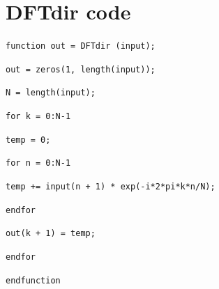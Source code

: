 \documentclass[a4paper, 12pt]{report}
\begin{document}
	\appendix
	\chapter{DFTdir code} %
	\label{sec:dftdir_code}
		\texttt{function out = DFTdir (input);}\par
		\texttt{out = zeros(1, length(input));}\par
		\indent\texttt{N = length(input);}\par
		\texttt{for k = 0:N-1}\par
		\hspace*{2em}\texttt{temp = 0;}\par
		\hspace*{2em}\texttt{for n = 0:N-1}\par
		\hspace*{4em}\texttt{temp += input(n + 1) * exp(-i*2*pi*k*n/N);}\par
		\hspace*{2em}\texttt{endfor}\par
		\hspace*{2em}\texttt{out(k + 1) = temp;}\par
		\texttt{endfor}\par
		\noindent\texttt{endfunction}\par
\end{document}

